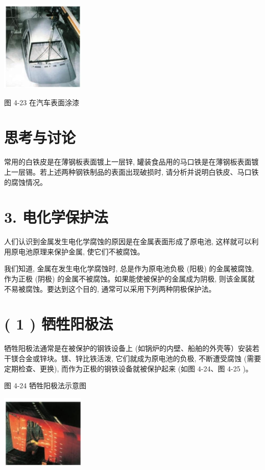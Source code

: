 \documentclass[10pt]{article}
\begin{document}
\begin{center}
\includegraphics[max width=0.3\textwidth]{images/0190da9d-8bfd-732f-bc2c-0b21d0f13b91_118_104404.jpg}
\end{center}

图 4-23 在汽车表面涂漆

\section*{思考与讨论}

常用的白铁皮是在薄钢板表面镀上一层锌, 罐装食品用的马口铁是在薄钢板表面镀上一层锡。若上述两种钢铁制品的表面出现破损时, 请分析并说明白铁皮、马口铁的腐蚀情况。

\section*{3. 电化学保护法}

人们认识到金属发生电化学腐蚀的原因是在金属表面形成了原电池, 这样就可以利用原电池原理来保护金属, 使它们不被腐蚀。

我们知道, 金属在发生电化学腐蚀时, 总是作为原电池负极 (阳极) 的金属被腐蚀, 作为正极 (阴极) 的金属不被腐蚀。如果能使被保护的金属成为阴极, 则该金属就不易被腐蚀。要达到这个目的, 通常可以采用下列两种阴极保护法。

\section*{( 1 ) 牺牲阳极法}

牺牲阳极法通常是在被保护的钢铁设备上 (如锅炉的内壁、船舶的外壳等）安装若干镁合金或锌块。镁、锌比铁活泼, 它们就成为原电池的负极, 不断遭受腐蚀 (需要定期检查、更换), 而作为正极的钢铁设备就被保护起来 (如图 4-24、图 4-25 )。

图 4-24 牺牲阳极法示意图

\begin{center}
\includegraphics[max width=0.3\textwidth]{images/0190da9d-8bfd-732f-bc2c-0b21d0f13b91_119_738348.jpg}
\end{center}
\end{document}
